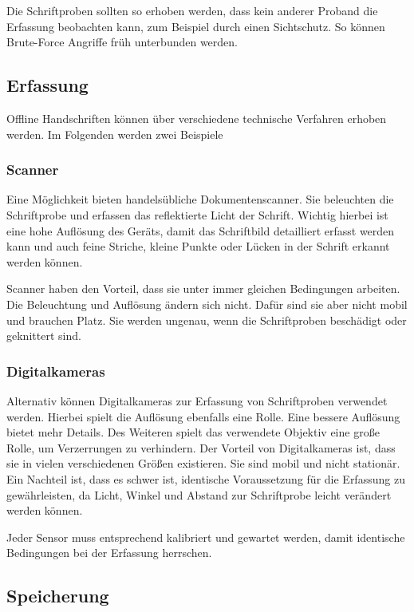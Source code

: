 \documentclass{article}
\begin{document}
Die Schriftproben sollten so erhoben werden, dass kein anderer Proband die Erfassung beobachten kann, zum 
Beispiel durch einen Sichtschutz. So können Brute-Force Angriffe früh unterbunden werden.
 
\subsection{Erfassung}

Offline Handschriften können über verschiedene technische Verfahren erhoben werden. Im Folgenden werden 
zwei Beispiele 

\subsubsection{Scanner}

Eine Möglichkeit bieten handelsübliche Dokumentenscanner. Sie beleuchten die Schriftprobe und erfassen das 
reflektierte Licht der Schrift. Wichtig hierbei ist eine hohe Auflösung des Geräts, damit das Schriftbild 
detailliert erfasst werden kann und auch feine Striche, kleine Punkte oder Lücken in der Schrift erkannt 
werden können.

Scanner haben den Vorteil, dass sie unter immer gleichen Bedingungen arbeiten. Die Beleuchtung und 
Auflösung ändern sich nicht. Dafür sind sie aber nicht mobil und brauchen Platz. Sie werden ungenau, wenn 
die Schriftproben beschädigt oder geknittert sind.

\subsubsection{Digitalkameras}

Alternativ können Digitalkameras zur Erfassung von Schriftproben verwendet werden. Hierbei spielt die 
Auflösung ebenfalls eine Rolle. Eine bessere Auflösung bietet mehr Details. Des Weiteren spielt das 
verwendete Objektiv eine große Rolle, um Verzerrungen zu verhindern. Der Vorteil von Digitalkameras ist, 
dass sie in vielen verschiedenen Größen existieren. Sie sind mobil und nicht stationär. Ein Nachteil ist, 
dass es schwer ist, identische Voraussetzung für die Erfassung zu gewährleisten, da Licht, Winkel und 
Abstand zur Schriftprobe leicht verändert werden können.

Jeder Sensor muss entsprechend kalibriert und gewartet werden, damit identische Bedingungen bei der
Erfassung herrschen.

\subsection{Speicherung}
\end{document}
